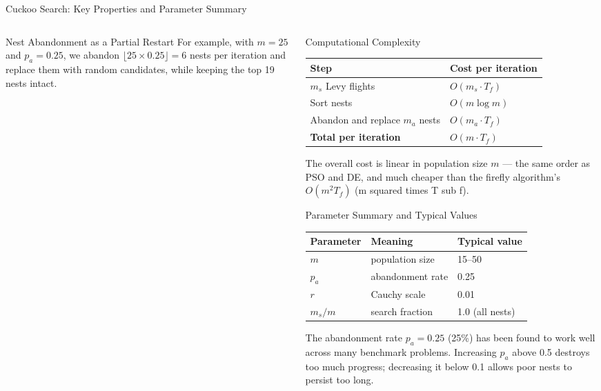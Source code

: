 \documentclass[aspectratio=169,10pt]{beamer}
\begin{document}
\begin{frame}[allowframebreaks]{Cuckoo Search: Key Properties and Parameter Summary}
\begin{columns}[T]
\begin{column}{0.52\textwidth}
\begin{block}{Nest Abandonment as a Partial Restart}
        For example, with $m = 25$ and $p_a = 0.25$, we abandon
        $\lfloor 25 \times 0.25 \rfloor = 6$ nests per iteration
        and replace them with random candidates, while keeping the
        top 19 nests intact.
      \end{block}
    \end{column}
    \begin{column}{0.46\textwidth}
      \begin{block}{Computational Complexity}
        \begin{tabular}{ll}
          \toprule
          Step & Cost per iteration \\
          \midrule
          $m_s$ Levy flights & $O(m_s \cdot T_f)$ \\
          Sort nests & $O(m \log m)$ \\
          Abandon and replace $m_a$ nests & $O(m_a \cdot T_f)$ \\
          \midrule
          \textbf{Total per iteration} & $O(m \cdot T_f)$ \\
          \bottomrule
        \end{tabular}
        \vspace{4pt}
        The overall cost is linear in population size $m$ --- the
        same order as PSO and DE, and much cheaper than the firefly
        algorithm's $O(m^2 T_f)$ (m squared times T sub f).
      \end{block}

      \begin{block}{Parameter Summary and Typical Values}
        \begin{tabular}{lll}
          \toprule
          Parameter & Meaning & Typical value \\
          \midrule
          $m$ & population size & 15--50 \\
          $p_a$ & abandonment rate & 0.25 \\
          $r$ & Cauchy scale & 0.01 \\
          $m_s/m$ & search fraction & 1.0 (all nests) \\
          \bottomrule
        \end{tabular}
        \vspace{4pt}
        The abandonment rate $p_a = 0.25$ (25\%) has been found
        to work well across many benchmark problems.  Increasing
        $p_a$ above 0.5 destroys too much progress; decreasing
        it below 0.1 allows poor nests to persist too long.
      \end{block}


\end{column}
\end{columns}
\end{frame}
\end{document}
